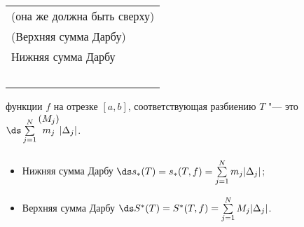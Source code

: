 
 	\begin{tabular}{l}\scriptsize{(она же должна быть сверху)}\\(Верхняя сумма Дарбу)\\Нижняя сумма Дарбу\\ \ \end{tabular} функции $f$ на отрезке $[a,b]$, соответствующая
 	разбиению $T$ "--- это $\ds\sum\limits_{j=1}^N\begin{matrix}(M_j)\\m_j\\ \ \end{matrix}|\Delta_j|$.
 	
 	\begin{itemize}
 	  \item Нижняя сумма Дарбу $\ds s_*(T)=s_*(T,f)=\sum\limits_{j=1}^Nm_j|\Delta_j|$;
 	  \item Верхняя сумма Дарбу $\ds S^*(T)=S^*(T,f)=\sum\limits_{j=1}^NM_j|\Delta_j|$. 
 	\end{itemize}
 